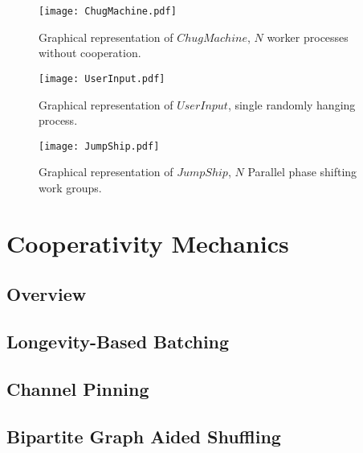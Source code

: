 \begin{figure}
\centering
\texttt{[image: ChugMachine.pdf]}
\caption{Graphical representation of $ChugMachine$, $N$ worker processes 
without cooperation.}
\label{fig:}
\end{figure}

\begin{figure}
\centering
\texttt{[image: UserInput.pdf]}
\caption{Graphical representation of $UserInput$, single randomly hanging 
process.}
\label{fig:}
\end{figure}

\begin{figure}
\centering
\texttt{[image: JumpShip.pdf]}
\caption{Graphical representation of $JumpShip$, $N$ Parallel phase shifting 
work groups.}
\label{fig:JumpShip}
\end{figure}





\section{Cooperativity Mechanics}\label{sec:cooperativity mechanics}

\subsection{Overview}\label{sec:cooperativity mechanics overview}
\subsection{Longevity-Based Batching}\label{sec:longevity based batching}
\subsection{Channel Pinning}\label{sec:channel pinning}
\subsection{Bipartite Graph Aided Shuffling}
    \label{sec:bipartite graph aided shuffling}


